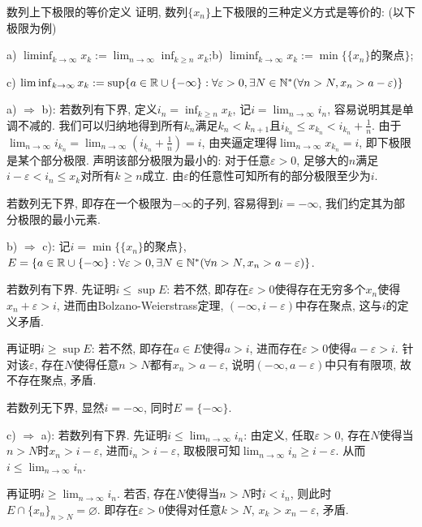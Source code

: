 \begin{exercise}{数列上下极限的等价定义}
	证明, 数列$\{ x_n \}$上下极限的三种定义方式是等价的: (以下极限为例)

a) $\liminf_{k\to \infty} x_k:=\lim_{n\to \infty} \inf_{k \geq n} x_k$;\qquad b) $\liminf_{k\to \infty} x_k:= \min  \{\{ x_n \}\text{的聚点} \}$; 

c) $\liminf_{k\to \infty} x_k:= \sup \{ a\in \mathbb{R} \cup \{ -\infty \}: \forall \varepsilon >0, \exists N \in \mathbb{N}^{*} (\forall n>N, x_n>a-\varepsilon ) \}$

\end{exercise}
\begin{solution}
	a) $\Rightarrow$ b): 若数列有下界, 定义$i_n=\inf_{k\geq n}x_k$, 记$i=\lim_{n\to \infty} i_{n}$, 容易说明其是单调不减的. 我们可以归纳地得到所有$k_n$满足$k_n<k_{n+1}$且$i_{k_n} \leq x_{k_n} < i_{k_n}+\frac{1}{n}$. 由于$\lim_{n\to \infty} i_{k_n} = \lim_{n\to \infty} (i_{k_n}+\frac{1}{n} ) = i$, 由夹逼定理得$\lim_{n\to \infty} x_{k_n}=i$, 即下极限是某个部分极限. 声明该部分极限为最小的: 对于任意$\varepsilon >0$, 足够大的$n$满足$i-\varepsilon < i_n \leq x_k$对所有$k \geq n$成立. 由$\varepsilon$的任意性可知所有的部分极限至少为$i$. 
	
	若数列无下界, 即存在一个极限为$-\infty$的子列, 容易得到$i=-\infty$, 我们约定其为部分极限的最小元素. 
	
	b) $\Rightarrow$ c): 记$i=\min  \{\{ x_n \}\text{的聚点} \}$, $E = \{ a\in \mathbb{R} \cup \{ -\infty \}: \forall \varepsilon >0, \exists N \in \mathbb{N}^{*} (\forall n>N, x_n>a-\varepsilon ) \}$. 
	
	若数列有下界. 先证明$i \leq \sup E$: 若不然, 即存在$\varepsilon >0$使得存在无穷多个$x_n$使得$x_n+\varepsilon >i$, 进而由Bolzano-Weierstrass定理, $(-\infty ,i-\varepsilon)$中存在聚点, 这与$i$的定义矛盾. 
	
	再证明$i \geq \sup E$: 若不然, 即存在$a \in E$使得$a>i$, 进而存在$\varepsilon >0$使得$a-\varepsilon >i$. 针对该$\varepsilon$, 存在$N$使得任意$n>N$都有$x_n>a-\varepsilon$, 说明$(-\infty ,a-\varepsilon)$中只有有限项, 故不存在聚点, 矛盾. 
	
	若数列无下界, 显然$i=-\infty$, 同时$E=\{ -\infty \}$. 
	
	c) $\Rightarrow$ a): 若数列有下界. 先证明$i \leq \lim_{n\to \infty} i_n$: 由定义, 任取$\varepsilon >0$, 存在$N$使得当$n>N$时$x_n > i-\varepsilon$, 进而$i_n > i-\varepsilon$, 取极限可知$\lim_{n\to \infty} i_n \geq i-\varepsilon$. 从而$i \leq \lim_{n\to \infty} i_n$. 
	
	再证明$i \geq \lim_{n\to \infty} i_n$. 若否, 存在$N$使得当$n>N$时$i<i_n$, 则此时$E \cap \{ x_n \}_{n>N} = \varnothing$. 即存在$\varepsilon >0$使得对任意$k>N$, $x_k > x_n-\varepsilon$, 矛盾. 
\end{solution}

